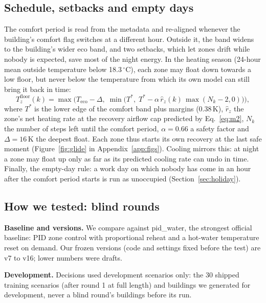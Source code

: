 \documentclass{article}
\begin{document}
\subsection{Schedule, setbacks and empty days}\label{sec:schedule}
The comfort period is read from the metadata and re-aligned whenever the building's comfort flag switches at a
different hour. Outside it, the band widens to the building's wider eco band, and two setbacks, which let zones drift
while nobody is expected, save most of the night energy. In the
heating season (24-hour mean outside temperature below 18.3\,$^\circ$C), each zone may float down towards a low floor,
but never below the temperature from which its own model can still bring it back in time:
\begin{equation}\label{eq:glide}
T^{\mathrm{floor}}_z(k) = \max\!\Big(T_{\mathrm{eco}}-\Delta,\; \min\big(T^{*},\; T^{*} - \alpha\, \hat r_z(k)\,\max(N_k-2,0)\big)\Big),
\end{equation}
where $T^{*}$ is the lower edge of the comfort band plus margins (0.38\,K), $\hat r_z$ the zone's net heating rate at the recovery
airflow cap predicted by Eq.~\ref{eq:m2}, $N_k$ the number of steps left until the comfort period, $\alpha=0.66$ a
safety factor and $\Delta=16$\,K the deepest float. Each zone thus starts its own recovery at the last safe moment
(Figure~\ref{fig:glide} in Appendix~\ref{app:figs}). Cooling mirrors this: at night a zone may float up only as far as
its predicted cooling rate can undo in time. Finally, the empty-day rule: a work day on which nobody has come in an
hour after the comfort period starts is run as unoccupied (Section~\ref{sec:holiday}).

\subsection{How we tested: blind rounds}\label{sec:protocol}
\textbf{Baseline and versions.} We compare against pid\_water, the strongest official baseline: PID zone
control with proportional reheat and a hot-water temperature reset on demand. Our frozen versions (code and
settings fixed before the test) are v7 to v16; lower numbers were drafts.

\textbf{Development.} Decisions used development scenarios only: the 30 shipped training scenarios (after round 1 at
full length) and buildings we generated for development, never a blind round's buildings before its run.
\end{document}
